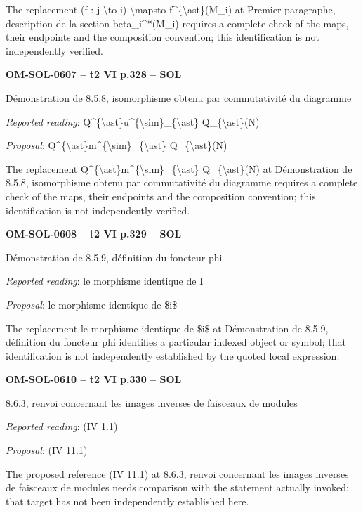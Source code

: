 The replacement (f : j \textbackslash{}to i) \textbackslash{}mapsto f\textasciicircum{}\{\textbackslash{}ast\}(M\_i) at Premier paragraphe, description de la section beta\_i\textasciicircum{}*(M\_i) requires a complete check of the maps, their endpoints and the composition convention; this identification is not independently verified.\par
\par\noindent\textbf{OM-SOL-0607 -- t2 VI p.328 -- SOL}\par
Démonstration de 8.5.8, isomorphisme obtenu par commutativité du diagramme\par
\emph{Reported reading}: Q\textasciicircum{}\{\textbackslash{}ast\}u\textasciicircum{}\{\textbackslash{}sim\}\_\{\textbackslash{}ast\} Q\_\{\textbackslash{}ast\}(N)\par
\emph{Proposal}: Q\textasciicircum{}\{\textbackslash{}ast\}m\textasciicircum{}\{\textbackslash{}sim\}\_\{\textbackslash{}ast\} Q\_\{\textbackslash{}ast\}(N)\par
The replacement Q\textasciicircum{}\{\textbackslash{}ast\}m\textasciicircum{}\{\textbackslash{}sim\}\_\{\textbackslash{}ast\} Q\_\{\textbackslash{}ast\}(N) at Démonstration de 8.5.8, isomorphisme obtenu par commutativité du diagramme requires a complete check of the maps, their endpoints and the composition convention; this identification is not independently verified.\par
\par\noindent\textbf{OM-SOL-0608 -- t2 VI p.329 -- SOL}\par
Démonstration de 8.5.9, définition du foncteur phi\par
\emph{Reported reading}: le morphisme identique de I\par
\emph{Proposal}: le morphisme identique de \$i\$\par
The replacement le morphisme identique de \$i\$ at Démonstration de 8.5.9, définition du foncteur phi identifies a particular indexed object or symbol; that identification is not independently established by the quoted local expression.\par
\par\noindent\textbf{OM-SOL-0610 -- t2 VI p.330 -- SOL}\par
8.6.3, renvoi concernant les images inverses de faisceaux de modules\par
\emph{Reported reading}: (IV 1.1)\par
\emph{Proposal}: (IV 11.1)\par
The proposed reference (IV 11.1) at 8.6.3, renvoi concernant les images inverses de faisceaux de modules needs comparison with the statement actually invoked; that target has not been independently established here.\par
